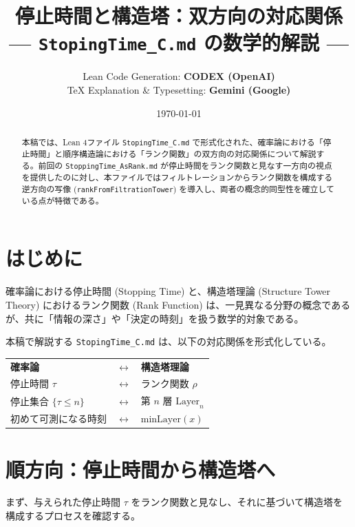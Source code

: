 \documentclass[a4paper,11pt]{ltjsarticle}
\title{\textbf{停止時間と構造塔：双方向の対応関係} \\ \large --- \texttt{StopingTime\_C.md} の数学的解説 ---}
\author{
    Lean Code Generation: \textbf{CODEX (OpenAI)} \\
    TeX Explanation \& Typesetting: \textbf{Gemini (Google)}
}
\date{\today}
\theoremstyle{definition}
\newcommand{\Tau}{\tau}
\newcommand{\Rank}{\rho}
\newcommand{\Layer}[1]{\mathrm{Layer}_{#1}}
\newcommand{\MinLayer}{\mathrm{minLayer}}
\begin{document}
\maketitle

\begin{abstract}
本稿では、Lean 4ファイル \texttt{StopingTime\_C.md} で形式化された、確率論における「停止時間」と順序構造論における「ランク関数」の双方向の対応関係について解説する。前回の \texttt{StoppingTime\_AsRank.md} が停止時間をランク関数と見なす一方向の視点を提供したのに対し、本ファイルではフィルトレーションからランク関数を構成する逆方向の写像 (\texttt{rankFromFiltrationTower}) を導入し、両者の概念的同型性を確立している点が特徴である。
\end{abstract}

\tableofcontents

\section{はじめに}
確率論における停止時間 (Stopping Time) と、構造塔理論 (Structure Tower Theory) におけるランク関数 (Rank Function) は、一見異なる分野の概念であるが、共に「情報の深さ」や「決定の時刻」を扱う数学的対象である。

本稿で解説する \texttt{StopingTime\_C.md} は、以下の対応関係を形式化している。

\begin{center}
\begin{tcolorbox}[colback=blue!5!white,colframe=blue!50!black,title=概念の辞書]
\begin{tabular}{lcl}
\textbf{確率論} & $\longleftrightarrow$ & \textbf{構造塔理論} \\
停止時間 $\Tau$ & $\longleftrightarrow$ & ランク関数 $\Rank$ \\
停止集合 $\{\Tau \le n\}$ & $\longleftrightarrow$ & 第 $n$ 層 $\Layer{n}$ \\
初めて可測になる時刻 & $\longleftrightarrow$ & $\MinLayer(x)$ \\
\end{tabular}
\end{tcolorbox}
\end{center}

\section{順方向：停止時間から構造塔へ}

まず、与えられた停止時間 $\Tau$ をランク関数と見なし、それに基づいて構造塔を構成するプロセスを確認する。
\end{document}
